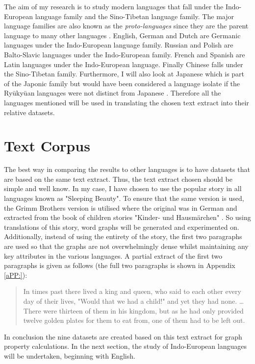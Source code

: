 The aim of my research is to study modern languages that fall under the Indo-European language family and the Sino-Tibetan language family. The major language families are also known as the \emph{proto-languages} since they are the parent language to many other languages \cite{rowe2022concise}. English, German and Dutch are Germanic languages under the Indo-European language family. Russian and Polish are Balto-Slavic languages under the Indo-European family.  French and Spanish are Latin languages under the Indo-European language. Finally Chinese falls under the Sino-Tibetan family. Furthermore, I will also look at Japanese which is part of the Japonic family but would have been considered a language isolate if the Ryūkyūan languages were not distinct from Japanese \cite{campbell2010language}. Therefore all the languages mentioned will be used in translating the chosen text extract into their relative datasets.

\section{Text Corpus}
The best way in comparing the results to other languages is to have datasets that are based on the same text extract. Thus, the text extract chosen should be simple and well know. In my case, I have chosen to use the popular story in all languages known as "Sleeping Beauty". To ensure that the same version is used, the Grimm Brothers version is utilised where the original was in German and extracted from the book of children stories "Kinder- und Hausmärchen" \cite{grimm1857kinder}. So using translations of this story, word graphs will be generated and experimented on.  Additionally, instead of using the entirety of the story, the first two paragraphs are used so that the graphs are not overwhelmingly dense whilst maintaining any key attributes in the various languages. A partial extract of the first two paragraphs is given as follows (the full two paragraphs is shown in Appendix \ref{aPP:}):
\begin{quote}
In times past there lived a king and queen, who said to each other every day of their lives, "Would that we had a child!" and yet they had none. \dots There were thirteen of them in his kingdom, but as he had only provided twelve golden plates for them to eat from, one of them had to be left out.
\end{quote}
In conclusion the nine datasets are created based on this text extract for graph property calculations. In the next section, the study of Indo-European languages will be undertaken, beginning with English.


